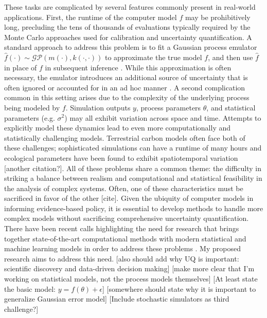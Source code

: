 \documentclass[12pt]{article}
\begin{document}
These tasks are complicated by several features commonly present in real-world applications. First, the runtime of the computer model $f$ may be prohibitively long, 
precluding the tens of thousands of evaluations typically required by the Monte Carlo approaches used for calibration and uncertainty quantification. A standard approach to address this problem is to fit a Gaussian process 
emulator $\hat{f}(\cdot) \sim \mathcal{GP}(m(\cdot), k(\cdot, \cdot))$ to approximate the true model $f$, and then use $\hat{f}$
in place of $f$ in subsequent inference \cite{Kennedy, Fer, Cleary}. While this approximation is often necessary, the emulator introduces an additional source of uncertainty that is often ignored 
or accounted for in an ad hoc manner \cite{Fer}. A second complication common in this setting arises due to the complexity of the underlying process being modeled by $f$. Simulation outputs $y$, process parameters $\theta$, and statistical parameters 
(e.g. $\sigma^2$) may all exhibit variation across space and time. Attempts to explicitly model these dynamics lead to even more computationally and statistically challenging models. Terrestrial carbon models often face both of these challenges; sophisticated simulations can have a runtime of many hours \cite{Fer} and ecological parameters have been found to exhibit spatiotemporal variation \cite{Fer2} [another citation?]. All of these problems share a common theme: the difficulty in striking a balance between realism and computational and statistical feasibility in the analysis of complex systems. Often, one of these characteristics must be sacrificed in favor of the other [cite].
Given the ubiquity of computer models in informing evidence-based policy, it is essential to develop methods to handle more complex models without sacrificing
comprehensive uncertainty quantification.
There have been recent calls highlighting the need for research that brings together state-of-the-art computational methods with modern statistical and machine learning models in order to address these problems \cite{Wikle, Baker}. My proposed research aims to address this need. 
[also should add why UQ is important: scientific discovery and data-driven decision making] [make more clear that I'm working on statistical models, not the process models themselves] [At least state the basic model: $y = f(\theta) + \epsilon$] [somewhere should state why it is important to generalize Gaussian error model] [Include stochastic simulators as third challenge?]
\end{document}
